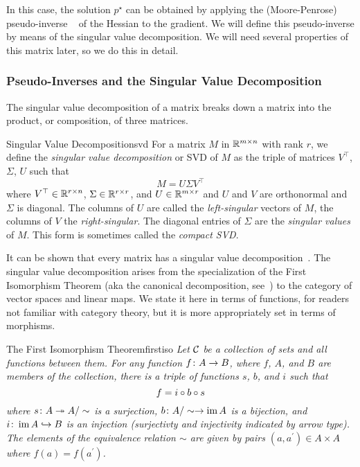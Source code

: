 \documentclass[../../thesis.tex]{subfiles}
\begin{document}
In this case, the solution $p^\star$
can be obtained by applying the
(Moore-Penrose) pseudo-inverse%
~\cite{penrose1955}
of the Hessian to the gradient.
We will define this pseudo-inverse
by means of the singular value decomposition.
We will need several properties
of this matrix later,
so we do this in detail.

\subsubsection{Pseudo-Inverses and the Singular Value Decomposition}

The singular value decomposition of a matrix
breaks down a matrix into the product,
or composition, of three matrices.
\begin{definition}{Singular Value Decomposition}{svd}
	For a matrix $M$ in $\mathbb{R}^{m \times n}$
	with rank $r$,
	we define the
	\emph{singular value decomposition} or SVD of $M$
	as the triple of matrices $V^\top$, $\Sigma$, $U$
	such that
	\begin{equation}
		M = U \Sigma V^\top
	\end{equation}
	where $V^\top \in \mathbb{R}^{r \times n}$,
	$\Sigma \in \mathbb{R}^{r \times r}$, and
	$U \in \mathbb{R}^{m \times r}$
	and $U$ and $V$ are orthonormal
	and $\Sigma$ is diagonal.
	The columns of $U$ are called the \emph{left-singular}
	vectors of $M$, the columns of $V$ the \emph{right-singular}.
	The diagonal entries of $\Sigma$ are the \emph{singular values} of $M$.
	This form is sometimes called the \emph{compact SVD}.
\end{definition}

It can be shown that every matrix has a
singular value decomposition~\cite{strang1993}.
The singular value decomposition arises
from the specialization of the First Isomorphism Theorem
(aka the canonical decomposition,
see~\cite[Theorem 2.7]{aluffi2009})
to the category of vector spaces and linear maps.
We state it here in terms of functions,
for readers not familiar with category theory,
but it is more appropriately set in terms of morphisms.

\begin{theorem}{The First Isomorphism Theorem}{firstiso}
	\emph{Let ${\mathcal{C}}$ be a collection of sets and all functions between them.
	For any function $f\colon A \to B$, where $f$, $A$, and $B$ are members of the collection,
	there is a triple of functions $s$, $b$, and $i$ such that
	\begin{equation}
	      f = i \circ b \circ s
	\end{equation}
	where $s\colon A \twoheadrightarrow A/\sim$ is a surjection,
	$b\colon A/\sim \to \operatorname*{im} A$ is a bijection, and
	$i\colon \operatorname*{im} A \hookrightarrow B$ is an injection
	(surjectivty and injectivity indicated by arrow type).
	The elements of the equivalence relation $\sim$
	are given by pairs $(a, a^\prime) \in A \times A$
	where $f(a) = f(a^\prime)$.}
\end{theorem}
\end{document}
